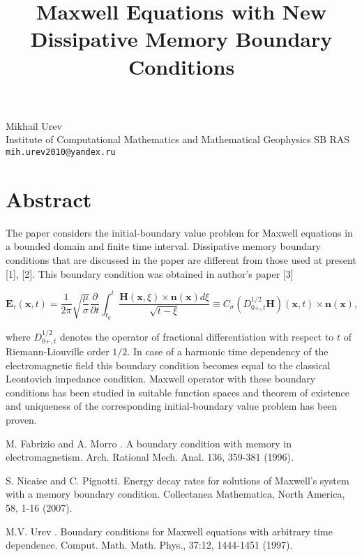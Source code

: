 \title{Maxwell Equations with New Dissipative Memory Boundary Conditions  }
 \author{} \institute{}
\maketitle
\begin{center}
{\large Mikhail Urev}\\
 Institute of Computational Mathematics and Mathematical Geophysics SB RAS\\
{\tt mih.urev2010@yandex.ru}

\end{center}

\section*{Abstract}


The paper considers the initial-boundary value problem for Maxwell
equations in a bounded domain and finite time interval.
Dissipative memory boundary conditions that are discussed in the
paper are different from those used at present [1], [2]. This
boundary condition was obtained in author's paper [3]

$$
\mathbf{E}_\tau(\mathbf{x},t) = \frac{1}{2\pi}
\sqrt{\frac{\mu}{\sigma} } \frac{\partial}{\partial t}\int_{t_0}^t
\frac{\mathbf{H} (\mathbf{x},\xi) \times \mathbf{n}(\mathbf{x}) d
\xi }{\sqrt{t-\xi} }  \equiv C_\sigma (D^{1/2}_{0+,t} \mathbf{H})
(\mathbf{x},t) \times \mathbf{n}(\mathbf {x}),
$$

where $ D^{1/2}_{0+,t} $ denotes the operator of fractional
differentiation with respect to $t$ of Riemann-Liouville order
$1/2$. In case of a harmonic time dependency of the
electromagnetic field this boundary condition becomes equal to the
classical Leontovich impedance condition. Maxwell operator with
these boundary conditions has been studied in suitable function
spaces and theorem of existence and uniqueness of the
corresponding initial-boundary value problem has been proven.



\begin{thebibliography}{10}

{\sc  M. Fabrizio and A. Morro }. {A boundary condition with memory in electromagnetism}. Arch. Rational Mech. Anal. 136, 359-381 (1996).



{\sc S. Nicaise and C. Pignotti}. { Energy decay rates for solutions of Maxwell's system with a memory boundary condition}. Collectanea Mathematica, North America, 58, 1-16 (2007).



{\sc  M.V. Urev }. {Boundary conditions for Maxwell equations with arbitrary time dependence}. Comput. Math. Math. Phys., 37:12, 1444-1451 (1997).

\end{thebibliography}
